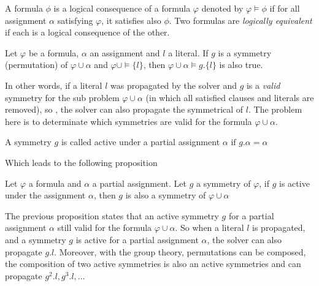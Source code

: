 
\begin{definition}
	\label{def:logical_consequence}
	A formula $\phi$ is a logical consequence of a formula $\varphi$ denoted by $\varphi \models \phi$ if for all assignment
	$\alpha$ satisfying $\varphi$, it satisfies also $\phi$. Two formulas are \emph{logically equivalent} if each is a logical
	consequence of the other.
\end{definition}


\begin{proposition}
	\label{prop:symmetry_propagation}
	Let $\varphi$ be a formula, $\alpha$ an assignment and $l$ a literal. 
	If $g$ is a symmetry (permutation) of $\varphi \cup \alpha$ and
	$\varphi  \cup \models \{l\}$, then $\varphi \cup \alpha \models g.\{l\}$ is also true.
\end{proposition}

In other words, if a literal $l$ was propagated by the solver and $g$ is a \emph{valid} symmetry for the
sub problem $\varphi \cup \alpha$ (in which all satisfied clauses and literals are removed), so , the solver can
also propagate the symmetrical of $l$. The problem here is to determinate which symmetries are valid for the formula
$\varphi \cup \alpha$.

\begin{definition}
	A symmetry $g$ is called active under a partial assignment $\alpha$ $\text{if } g.\alpha = \alpha$
\end{definition}

Which leads to the following proposition

\begin{proposition}
	\label{prop:active_symmetry}
	Let $\varphi$ a formula and $\alpha$ a partial assignment. Let $g$ a symmetry of $\varphi$,
	if $g$ is active under the assignment $\alpha$, then $g$ is also a symmetry of $\varphi \cup \alpha$
\end{proposition}

The previous proposition states that an active symmetry $g$ for a partial assignment $\alpha$ still valid for
the formula $\varphi \cup \alpha$. So when a literal $l$ is propagated, and a symmetry $g$ is active for a
partial assignment $\alpha$, the solver can also propagate $g.l$. Moreover, with the group theory, permutations can be
composed, the composition of two active symmetries is also an active symmetries and can propagate $g^2.l, g^3.l, ... $

